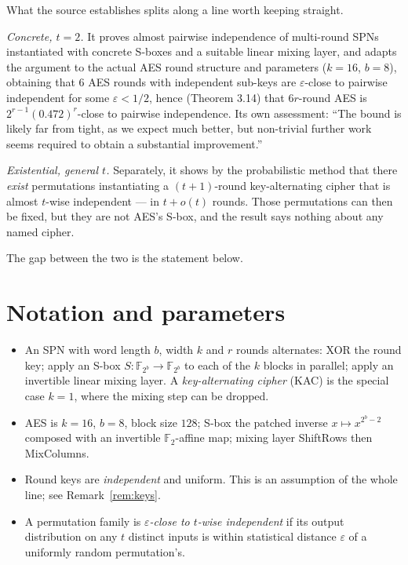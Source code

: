 \documentclass{aicr-conjecture}
\newcommand{\eps}{\varepsilon}
\begin{document}
What the source establishes splits along a line worth keeping straight.

\emph{Concrete, $t = 2$.} It proves almost pairwise independence of
multi-round SPNs instantiated with concrete S-boxes and a suitable linear
mixing layer, and adapts the argument to the actual AES round structure
and parameters ($k = 16$, $b = 8$), obtaining that $6$ AES rounds with
independent sub-keys are $\eps$-close to pairwise independent for some
$\eps < 1/2$, hence (Theorem 3.14) that $6r$-round AES is
$2^{r-1}(0.472)^{r}$-close to pairwise independence. Its own assessment:
``The bound is likely far from tight, as we expect much better, but
non-trivial further work seems required to obtain a substantial
improvement.''

\emph{Existential, general $t$.} Separately, it shows by the probabilistic
method that there \emph{exist} permutations instantiating a
$(t+1)$-round key-alternating cipher that is almost $t$-wise independent
--- in $t + o(t)$ rounds. Those permutations can then be fixed, but they
are not AES's S-box, and the result says nothing about any named cipher.

The gap between the two is the statement below.

\section{Notation and parameters}\label{sec:notation}

\begin{itemize}[nosep]
  \item An SPN with word length $b$, width $k$ and $r$ rounds alternates:
    XOR the round key; apply an S-box $S : \mathbb{F}_{2^{b}} \to
    \mathbb{F}_{2^{b}}$ to each of the $k$ blocks in parallel; apply an
    invertible linear mixing layer. A \emph{key-alternating cipher} (KAC)
    is the special case $k = 1$, where the mixing step can be dropped.
  \item AES is $k = 16$, $b = 8$, block size $128$; S-box the patched
    inverse $x \mapsto x^{2^{b}-2}$ composed with an invertible
    $\mathbb{F}_{2}$-affine map; mixing layer ShiftRows then MixColumns.
  \item Round keys are \emph{independent} and uniform. This is an
    assumption of the whole line; see Remark~\ref{rem:keys}.
  \item A permutation family is \emph{$\eps$-close to $t$-wise
    independent} if its output distribution on any $t$ distinct inputs is
    within statistical distance $\eps$ of a uniformly random
    permutation's.
\end{itemize}
\end{document}
